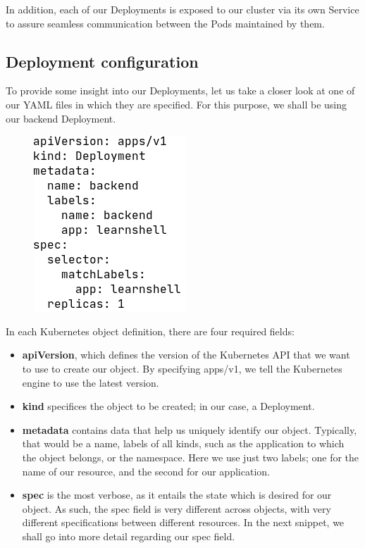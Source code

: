 \documentclass[thesis=B,english]{FITthesis}[2019/12/23]
\begin{document}
In addition, each of our Deployments is exposed to our cluster via its own Service to assure seamless communication between the Pods maintained by them.

\subsection{Deployment configuration}

To provide some insight into our Deployments, let us take a closer look at one of our YAML files in which they are specified. For this purpose, we shall be using our backend Deployment.

\begin{figure}[H]
\centering
\hspace*{-0.5cm}
\includegraphics[scale=0.5]{deploy-backend1}
\end{figure}

In each Kubernetes object definition, there are four required fields:

\begin{itemize}
  \setlength\itemsep{0em}
  \item \textbf{apiVersion}, which defines the version of the Kubernetes API that we want to use to create our object. By specifying apps/v1, we tell the Kubernetes engine to use the latest version.
  \item \textbf{kind} specifices the object to be created; in our case, a Deployment.
  \item \textbf{metadata} contains data that help us uniquely identify our object. Typically, that would be a name, labels of all kinds, such as the application to which the object belongs, or the namespace. Here we use just two labels; one for the name of our resource, and the second for our application.
  \item \textbf{spec} is the most verbose, as it entails the state which is desired for our object. As such, the spec field is very different across objects, with very different specifications between different resources. In the next snippet, we shall go into more detail regarding our spec field.
\end{itemize}
\end{document}
